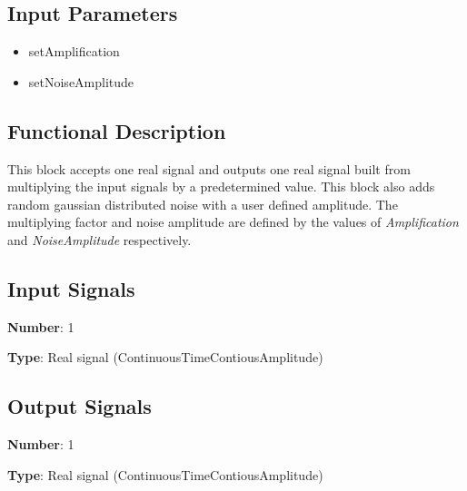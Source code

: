\documentclass[../../sdf/tex/BPSK_system.tex]{subfiles}
\date{ }
\begin{document}
\onlyinsubfile{\maketitle}

\subsection*{Input Parameters}

\begin{multicols}{2}
	\begin{itemize}
		\item setAmplification
		\item setNoiseAmplitude
	\end{itemize}
\end{multicols}

\subsection*{Functional Description}

This block accepts one real signal and outputs one real signal built from multiplying the input signals by a predetermined value. This block also adds random gaussian distributed noise with a user defined amplitude. The multiplying factor and noise amplitude are defined by the values of \textit{Amplification} and \textit{NoiseAmplitude} respectively.

\subsection*{Input Signals}

\textbf{Number}: 1

\textbf{Type}: Real signal (ContinuousTimeContiousAmplitude)

\subsection*{Output Signals}

\textbf{Number}: 1

\textbf{Type}: Real signal (ContinuousTimeContiousAmplitude)
\end{document}
